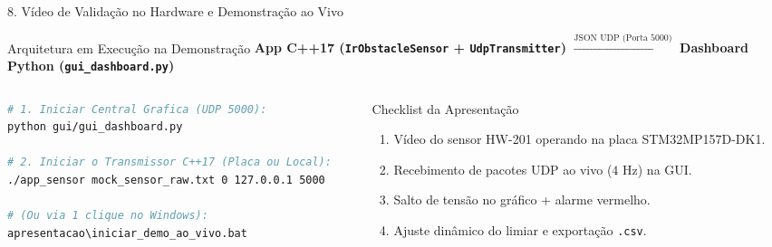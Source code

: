 \documentclass[aspectratio=169,10pt]{beamer}
\begin{document}
\begin{frame}[fragile]{8. V\'{i}deo de Valida\c{c}\~{a}o no Hardware e Demonstra\c{c}\~{a}o ao Vivo}
  \begin{block}{Arquitetura em Execu\c{c}\~{a}o na Demonstra\c{c}\~{a}o}
    \centering\small
    \textbf{App C++17 (\texttt{IrObstacleSensor} + \texttt{UdpTransmitter})}
    $\xrightarrow{\text{JSON UDP (Porta 5000)}}$
    \textbf{Dashboard Python (\texttt{gui\_dashboard.py})}
  \end{block}

  \vspace{0.1cm}
  \begin{columns}[T,onlytextwidth]
    \begin{column}{0.52\textwidth}
\begin{lstlisting}[language=bash]
# 1. Iniciar Central Grafica (UDP 5000):
python gui/gui_dashboard.py

# 2. Iniciar o Transmissor C++17 (Placa ou Local):
./app_sensor mock_sensor_raw.txt 0 127.0.0.1 5000

# (Ou via 1 clique no Windows):
apresentacao\iniciar_demo_ao_vivo.bat
\end{lstlisting}
    \end{column}

    \begin{column}{0.45\textwidth}
      \begin{exampleblock}{Checklist da Apresenta\c{c}\~{a}o}
        \begin{enumerate}
          \item V\'{i}deo do sensor HW-201 operando na placa STM32MP157D-DK1.
          \item Recebimento de pacotes UDP ao vivo ($4\text{ Hz}$) na GUI.
          \item Salto de tens\~{a}o no gr\'{a}fico + alarme vermelho.
          \item Ajuste din\^{a}mico do limiar e exporta\c{c}\~{a}o \texttt{.csv}.
        \end{enumerate}
      \end{exampleblock}
    \end{column}
  \end{columns}
\end{frame}
\end{document}
